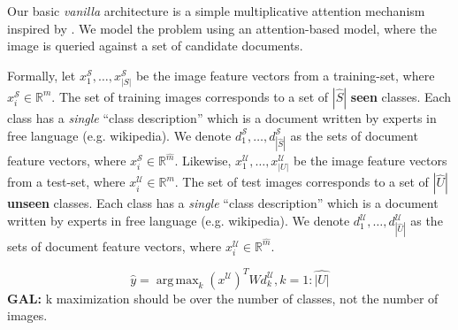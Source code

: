 \documentclass[11pt,a4paper]{article}
\DeclareMathOperator*{\argmax}{arg\,max}
\newcommand\gal[1]{\textcolor{bright}{\textbf{GAL:} #1 }}
\newcommand\yuval[1]{\textcolor{darkpink}{\textbf{YUVAL:} #1 }}
\begin{document}
Our basic {\em vanilla} architecture is a simple multiplicative attention mechanism \cite{luong2015effective} inspired by \citet{romera2015embarrassingly}. We model the problem using an attention-based model, where the image is queried
against a set of candidate documents.

Formally, let $x^{\mathcal{S}}_1,\ldots,x^{\mathcal{S}}_{|S|}$ be the image feature vectors from a training-set, where $x^{\mathcal{S}}_i\in \mathbb{R}^{m}$. The set of training images corresponds to a set of $|\hat{S}|$ \textbf{seen} classes. Each class has a \textit{single} \enquote{class description} which is a document written by experts in free language (e.g.  wikipedia). We denote  $d^{\mathcal{S}}_1,\ldots,d^{\mathcal{S}}_{|\hat{S}|}$ as the sets of  document feature vectors, 
where $x^{\mathcal{S}}_i\in \mathbb{R}^{\hat{m}}$.
Likewise, $x^{\mathcal{U}}_1,\ldots,x^{\mathcal{U}}_{|U|}$ be the image feature vectors from a test-set, where $x^{\mathcal{U}}_i\in \mathbb{R}^{m}$. The set of test images corresponds to a set of $|\hat{U}|$ \textbf{unseen} classes. Each class has a \textit{single} \enquote{class description} which is a document written by experts in free language (e.g.  wikipedia). We denote  $d^{\mathcal{U}}_1,\ldots,d^{\mathcal{U}}_{|\hat{U}|}$ as the sets of  document feature vectors, 
where $x^{\mathcal{U}}_i\in \mathbb{R}^{\hat{m}}$.





\begin{equation}
    \label{equation:attention}
    {\hat{y}}=\argmax_{k} \left( x^{\mathcal{U}} \right) ^{T}Wd^{\mathcal{U}}_{k}, k = 1 : \hat{|U|}
\end{equation}
\gal{k maximization should be over the number of classes, not the number of images.}
\end{document}
